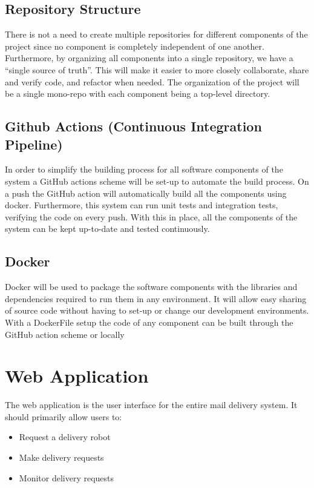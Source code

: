 \documentclass[12pt]{report}
\begin{document}
\subsection{Repository Structure}
There is not a need to create multiple repositories for different components of the project since no
component is completely independent of one another. Furthermore, by organizing all
components into a single repository, we have a “single source of truth”. This will make it easier
to more closely collaborate, share and verify code, and refactor when needed.
The organization of the project will be a single mono-repo with each component being a
top-level directory.

\subsection{Github Actions (Continuous Integration Pipeline)}
In order to simplify the building process for all software components of the system a GitHub
actions scheme will be set-up to automate the build process. On a push the GitHub action will
automatically build all the components using docker. Furthermore, this system can run unit tests
and integration tests, verifying the code on every push. With this in place, all the components of
the system can be kept up-to-date and tested continuously.
\subsection{Docker}
Docker will be used to package the software components with the libraries and dependencies
required to run them in any environment. It will allow easy sharing of source code without having
to set-up or change our development environments. With a DockerFile setup the code of any
component can be built through the GitHub action scheme or locally


\section{Web Application}
The web application is the user interface for the entire mail delivery system. It should primarily allow users to:
\begin{itemize}
\itemsep0em 
\item Request a delivery robot
\item Make delivery requests
\item Monitor delivery requests
\end{itemize}
\end{document}

